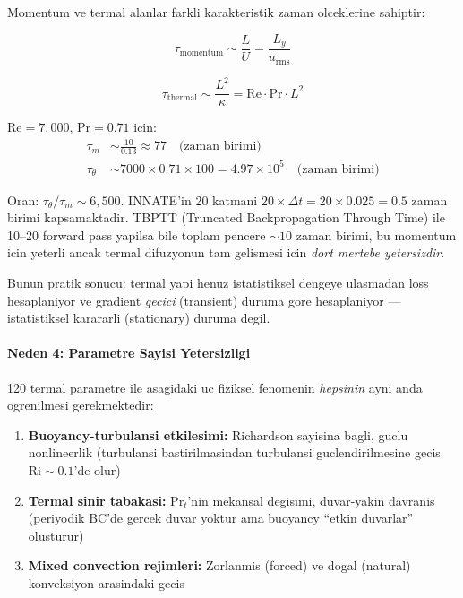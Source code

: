 Momentum ve termal alanlar farkli karakteristik zaman olceklerine sahiptir:

\begin{equation}
  \tau_\text{momentum} \sim \frac{L}{U} = \frac{L_y}{u_\text{rms}}
  \label{eq:tau-momentum}
\end{equation}

\begin{equation}
  \tau_\text{thermal} \sim \frac{L^2}{\kappa} = \text{Re} \cdot \text{Pr} \cdot L^2
  \label{eq:tau-thermal}
\end{equation}

$\text{Re} = 7{,}000$, $\text{Pr} = 0.71$ icin:
\begin{align*}
  \tau_m &\sim \frac{10}{0.13} \approx 77 \quad \text{(zaman birimi)} \\
  \tau_\theta &\sim 7000 \times 0.71 \times 100 = 4.97 \times 10^5
  \quad \text{(zaman birimi)}
\end{align*}

Oran: $\tau_\theta / \tau_m \sim 6{,}500$. INNATE'in 20 katmani
$20 \times \Delta t = 20 \times 0.025 = 0.5$ zaman birimi kapsamaktadir.
TBPTT (Truncated Backpropagation Through Time) ile 10--20 forward pass
yapilsa bile toplam pencere $\sim 10$ zaman birimi, bu momentum icin yeterli
ancak termal difuzyonun tam gelismesi icin \emph{dort mertebe yetersizdir}.

Bunun pratik sonucu: termal yapi henuz istatistiksel dengeye ulasmadan
loss hesaplaniyor ve gradient \emph{gecici} (transient) duruma gore
hesaplaniyor --- istatistiksel karararli (stationary) duruma degil.


\paragraph{Neden 4: Parametre Sayisi Yetersizligi}

120 termal parametre ile asagidaki uc fiziksel fenomenin \emph{hepsinin}
ayni anda ogrenilmesi gerekmektedir:

\begin{enumerate}
  \item \textbf{Buoyancy-turbulansi etkilesimi:} Richardson sayisina bagli,
        guclu nonlineerlik (turbulansi bastirilmasindan turbulansi
        guclendirilmesine gecis $\text{Ri} \sim 0.1$'de olur)
  \item \textbf{Termal sinir tabakasi:} $\text{Pr}_t$'nin mekansal degisimi,
        duvar-yakin davranis (periyodik BC'de gercek duvar yoktur ama
        buoyancy ``etkin duvarlar'' olusturur)
  \item \textbf{Mixed convection rejimleri:} Zorlanmis (forced) ve dogal
        (natural) konveksiyon arasindaki gecis
\end{enumerate}

